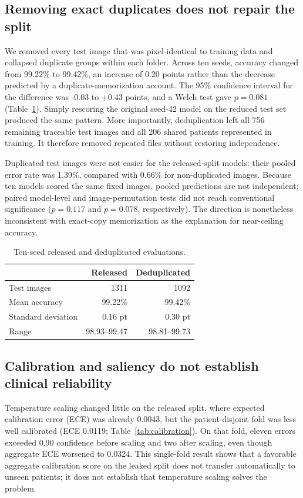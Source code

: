 ﻿\documentclass[11pt]{article}
\begin{document}
\subsection{Removing exact duplicates does not repair the split}
We removed every test image that was pixel-identical to training data and collapsed duplicate groups within each folder. Across ten seeds, accuracy changed from 99.22\% to 99.42\%, an increase of 0.20 points rather than the decrease predicted by a duplicate-memorization account. The 95\% confidence interval for the difference was -0.03 to +0.43 points, and a Welch test gave $p=0.081$ (Table~\ref{tab:dedup}). Simply rescoring the original seed-42 model on the reduced test set produced the same pattern. More importantly, deduplication left all 756 remaining traceable test images and all 206 shared patients represented in training. It therefore removed repeated files without restoring independence.

Duplicated test images were not easier for the released-split models: their pooled error rate was 1.39\%, compared with 0.66\% for non-duplicated images. Because ten models scored the same fixed images, pooled predictions are not independent; paired model-level and image-permutation tests did not reach conventional significance ($p=0.117$ and $p=0.078$, respectively). The direction is nonetheless inconsistent with exact-copy memorization as the explanation for near-ceiling accuracy.

\begin{table}[H]
\centering
\caption{Ten-seed released and deduplicated evaluations.}
\label{tab:dedup}
\small
\begin{tabular}{lrr}
\toprule
 & Released & Deduplicated \\
\midrule
Test images & 1311 & 1092 \\
Mean accuracy & 99.22\% & 99.42\% \\
Standard deviation & 0.16 pt & 0.30 pt \\
Range & 98.93--99.47 & 98.81--99.73 \\
\bottomrule
\end{tabular}
\end{table}

\subsection{Calibration and saliency do not establish clinical reliability}
Temperature scaling changed little on the released split, where expected calibration error (ECE) was already 0.0043, but the patient-disjoint fold was less well calibrated (ECE 0.0119; Table~\ref{tab:calibration}). On that fold, eleven errors exceeded 0.90 confidence before scaling and two after scaling, even though aggregate ECE worsened to 0.0324. This single-fold result shows that a favorable aggregate calibration score on the leaked split does not transfer automatically to unseen patients; it does not establish that temperature scaling solves the problem.
\end{document}
